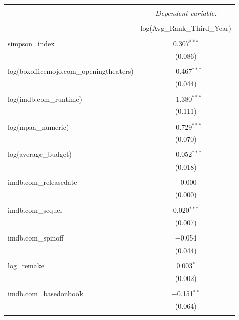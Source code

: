 
\begin{table}[!htbp] \centering 
  \caption{} 
  \label{} 
\begin{tabular}{@{\extracolsep{5pt}}lc} 
\\[-1.8ex]\hline 
\hline \\[-1.8ex] 
 & \multicolumn{1}{c}{\textit{Dependent variable:}} \\ 
\cline{2-2} 
\\[-1.8ex] & log(Avg\_Rank\_Third\_Year) \\ 
\hline \\[-1.8ex] 
 simpson\_index & 0.307$^{***}$ \\ 
  & (0.086) \\ 
  & \\ 
 log(boxofficemojo.com\_openingtheaters) & $-$0.467$^{***}$ \\ 
  & (0.044) \\ 
  & \\ 
 log(imdb.com\_runtime) & $-$1.380$^{***}$ \\ 
  & (0.111) \\ 
  & \\ 
 log(mpaa\_numeric) & $-$0.729$^{***}$ \\ 
  & (0.070) \\ 
  & \\ 
 log(average\_budget) & $-$0.052$^{***}$ \\ 
  & (0.018) \\ 
  & \\ 
 imdb.com\_releasedate & $-$0.000 \\ 
  & (0.000) \\ 
  & \\ 
 imdb.com\_sequel & 0.020$^{***}$ \\ 
  & (0.007) \\ 
  & \\ 
 imdb.com\_spinoff & $-$0.054 \\ 
  & (0.044) \\ 
  & \\ 
 log\_remake & 0.003$^{*}$ \\ 
  & (0.002) \\ 
  & \\ 
 imdb.com\_basedonbook & $-$0.151$^{**}$ \\ 
  & (0.064) \\ 
  & \\ 

\end{tabular}
\end{table}
